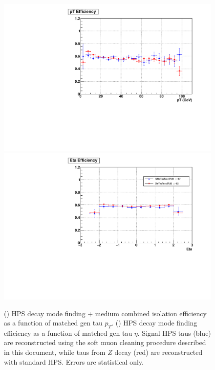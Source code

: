 \begin{figure}[hbtp]
  \begin{center}
    \includegraphics[width=\cmsFigWidth]{figures/gentau_dmfmi_pt}
    \includegraphics[width=\cmsFigWidth]{figures/gentau_dmfmi_eta}
    \caption{(\cmsLeft) HPS decay mode finding + medium combined isolation efficiency as a function of matched gen tau $p_T$. (\cmsRight) HPS decay mode finding efficiency as a function of matched gen tau $\eta$.  Signal HPS taus (blue) are reconstructed using the soft muon cleaning procedure described in this document, while taus from $Z$ decay (red) are reconstructed with standard HPS. Errors are statistical only.}
    \label{fig:eff_dmf_mi}
  \end{center}
\end{figure}

